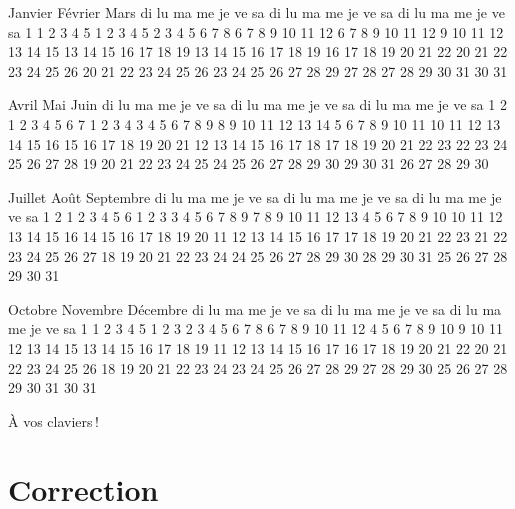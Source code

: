 \begin{C}
  Janvier               Février                 Mars          
di lu ma me je ve sa  di lu ma me je ve sa  di lu ma me je ve sa  
                   1         1  2  3  4  5         1  2  3  4  5  
 2  3  4  5  6  7  8   6  7  8  9 10 11 12   6  7  8  9 10 11 12  
 9 10 11 12 13 14 15  13 14 15 16 17 18 19  13 14 15 16 17 18 19  
16 17 18 19 20 21 22  20 21 22 23 24 25 26  20 21 22 23 24 25 26  
23 24 25 26 27 28 29  27 28                 27 28 29 30 31        
30 31                                                             

       Avril                  Mai                   Juin          
di lu ma me je ve sa  di lu ma me je ve sa  di lu ma me je ve sa  
                1  2   1  2  3  4  5  6  7            1  2  3  4  
 3  4  5  6  7  8  9   8  9 10 11 12 13 14   5  6  7  8  9 10 11  
10 11 12 13 14 15 16  15 16 17 18 19 20 21  12 13 14 15 16 17 18  
17 18 19 20 21 22 23  22 23 24 25 26 27 28  19 20 21 22 23 24 25  
24 25 26 27 28 29 30  29 30 31              26 27 28 29 30        
                                                                  

      Juillet                 Août               Septembre        
di lu ma me je ve sa  di lu ma me je ve sa  di lu ma me je ve sa  
                1  2      1  2  3  4  5  6               1  2  3  
 3  4  5  6  7  8  9   7  8  9 10 11 12 13   4  5  6  7  8  9 10  
10 11 12 13 14 15 16  14 15 16 17 18 19 20  11 12 13 14 15 16 17  
17 18 19 20 21 22 23  21 22 23 24 25 26 27  18 19 20 21 22 23 24  
24 25 26 27 28 29 30  28 29 30 31           25 26 27 28 29 30     
31                                                                

      Octobre               Novembre              Décembre        
di lu ma me je ve sa  di lu ma me je ve sa  di lu ma me je ve sa  
                   1         1  2  3  4  5               1  2  3  
 2  3  4  5  6  7  8   6  7  8  9 10 11 12   4  5  6  7  8  9 10  
 9 10 11 12 13 14 15  13 14 15 16 17 18 19  11 12 13 14 15 16 17  
16 17 18 19 20 21 22  20 21 22 23 24 25 26  18 19 20 21 22 23 24  
23 24 25 26 27 28 29  27 28 29 30           25 26 27 28 29 30 31  
30 31
\end{C}

À vos claviers !

\section{Correction}
\label{correction-2}

